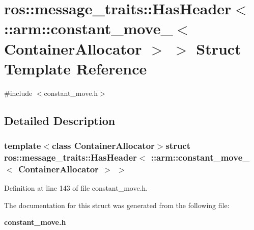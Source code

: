 \section{ros\-:\-:message\-\_\-traits\-:\-:\-Has\-Header$<$ \-:\-:arm\-:\-:constant\-\_\-move\-\_\-$<$ \-Container\-Allocator $>$ $>$ \-Struct \-Template \-Reference}
\label{structros_1_1message__traits_1_1HasHeader_3_01_1_1arm_1_1constant__move___3_01ContainerAllocator_01_4_01_4}


{\ttfamily \#include $<$constant\-\_\-move.\-h$>$}



\subsection{\-Detailed \-Description}
\subsubsection*{template$<$class Container\-Allocator$>$struct ros\-::message\-\_\-traits\-::\-Has\-Header$<$ \-::arm\-::constant\-\_\-move\-\_\-$<$ Container\-Allocator $>$ $>$}



\-Definition at line 143 of file constant\-\_\-move.\-h.



\-The documentation for this struct was generated from the following file\-:\begin{DoxyCompactItemize}
\item 
{\bf constant\-\_\-move.\-h}\end{DoxyCompactItemize}
